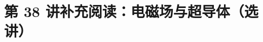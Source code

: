 \documentclass[UTF8,zihao=-4,oneside,openany]{ctexbook}
\begin{document}
\setcounter{page}{1}
\setcounter{equation}{0}

\section*{第 38 讲\quad 补充阅读：电磁场与超导体（选讲）}


\end{document}
